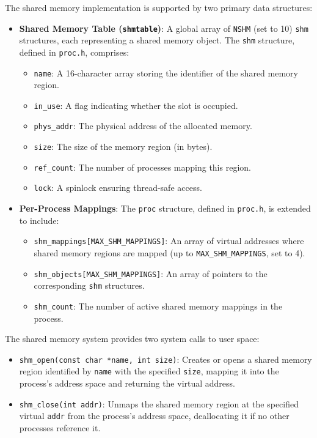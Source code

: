 \documentclass[12pt]{article}
\begin{document}
The shared memory implementation is supported by two primary data structures:
\begin{itemize}
  \item \textbf{Shared Memory Table (\texttt{shmtable})}: A global array of \texttt{NSHM} (set to 10) \texttt{shm} structures, each representing a shared memory object. The \texttt{shm} structure, defined in \texttt{proc.h}, comprises:
    \begin{itemize}
      \item \texttt{name}: A 16-character array storing the identifier of the shared memory region.
      \item \texttt{in\_use}: A flag indicating whether the slot is occupied.
      \item \texttt{phys\_addr}: The physical address of the allocated memory.
      \item \texttt{size}: The size of the memory region (in bytes).
      \item \texttt{ref\_count}: The number of processes mapping this region.
      \item \texttt{lock}: A spinlock ensuring thread-safe access.
    \end{itemize}
  \item \textbf{Per-Process Mappings}: The \texttt{proc} structure, defined in \texttt{proc.h}, is extended to include:
    \begin{itemize}
      \item \texttt{shm\_mappings[MAX\_SHM\_MAPPINGS]}: An array of virtual addresses where shared memory regions are mapped (up to \texttt{MAX\_SHM\_MAPPINGS}, set to 4).
      \item \texttt{shm\_objects[MAX\_SHM\_MAPPINGS]}: An array of pointers to the corresponding \texttt{shm} structures.
      \item \texttt{shm\_count}: The number of active shared memory mappings in the process.
    \end{itemize}
\end{itemize}

The shared memory system provides two system calls to user space:
\begin{itemize}
  \item \texttt{shm\_open(const char *name, int size)}: Creates or opens a shared memory region identified by \texttt{name} with the specified \texttt{size}, mapping it into the process’s address space and returning the virtual address.
  \item \texttt{shm\_close(int addr)}: Unmaps the shared memory region at the specified virtual \texttt{addr} from the process’s address space, deallocating it if no other processes reference it.
\end{itemize}
\end{document}
